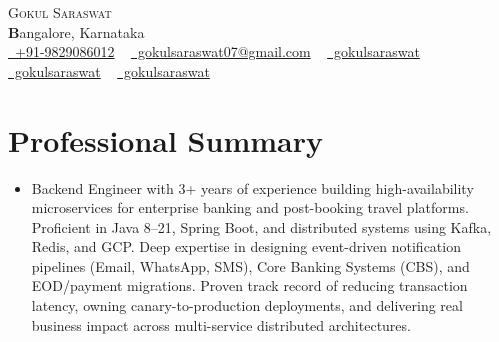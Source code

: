 \documentclass[letterpaper,11pt]{article}
\newcommand{\resumeSubHeadingListStart}{\begin{itemize}[leftmargin=0.0in, label={}]}
\newcommand{\resumeSubHeadingListEnd}{\end{itemize}}
\begin{document}
\begin{center}
    {\Huge \scshape Gokul Saraswat} \\ \vspace{1pt}
    \textbf Bangalore, Karnataka \\ \vspace{1pt}
    \small
    \href{tel:+919829086012}{\faPhone\ +91-9829086012} ~
    \href{mailto:gokulsaraswat07@gmail.com}{\faEnvelope\ gokulsaraswat07@gmail.com} ~
    \href{https://www.linkedin.com/in/gokulsaraswat/}{\faLinkedin\ gokulsaraswat} ~
    \href{https://github.com/gokulsaraswat}{\faGithub\ gokulsaraswat} ~
    \href{https://leetcode.com/u/gokulsaraswat/}{\faCode\ gokulsaraswat}

    \vspace{-8pt}
\end{center}

\section{Professional Summary}
\resumeSubHeadingListStart
    \item
     Backend Engineer with 3+ years of experience building high-availability microservices for enterprise banking and post-booking travel platforms. Proficient in Java 8--21, Spring Boot, and distributed systems using Kafka, Redis, and GCP. Deep expertise in designing event-driven notification pipelines (Email, WhatsApp, SMS), Core Banking Systems (CBS), and EOD/payment migrations. Proven track record of reducing transaction latency, owning canary-to-production deployments, and delivering real business impact across multi-service distributed architectures.
\resumeSubHeadingListEnd

\end{document}
